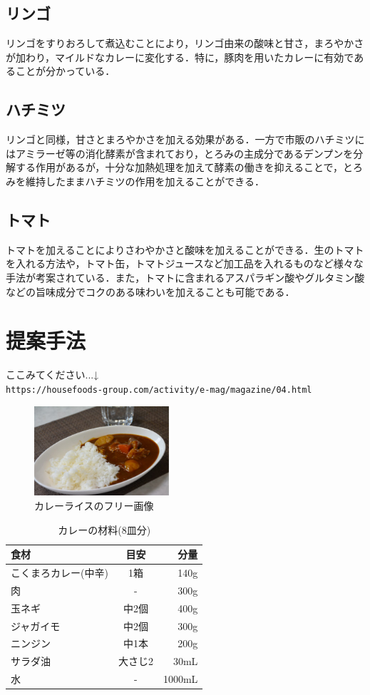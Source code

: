 \documentclass[a4paper, 11pt]{jsarticle}
\begin{document}
\subsection{リンゴ}
リンゴをすりおろして煮込むことにより，リンゴ由来の酸味と甘さ，まろやかさが加わり，マイルドなカレーに変化する．特に，豚肉を用いたカレーに有効であることが分かっている．

\subsection{ハチミツ}
リンゴと同様，甘さとまろやかさを加える効果がある．一方で市販のハチミツにはアミラーゼ等の消化酵素が含まれており，とろみの主成分であるデンプンを分解する作用があるが，十分な加熱処理を加えて酵素の働きを抑えることで，とろみを維持したままハチミツの作用を加えることができる．

\subsection{トマト}
トマトを加えることによりさわやかさと酸味を加えることができる．生のトマトを入れる方法や，トマト缶，トマトジュースなど加工品を入れるものなど様々な手法が考案されている．また，トマトに含まれるアスパラギン酸やグルタミン酸などの旨味成分でコクのある味わいを加えることも可能である．

\section{提案手法}
ここみてください...↓\\
\texttt{https://housefoods-group.com/activity/e-mag/magazine/04.html}

\begin{figure}[htb]
	\begin{center}
		\includegraphics[clip,width = 5.0cm]{curry.eps}
	\end{center}
	\caption{カレーライスのフリー画像}  \label{curryfig}
\end{figure}

\begin{table}[htb]
	\caption{カレーの材料(8皿分)}
	\centering
	\begin{tabular}{lcr}
		\hline
		食材 & 目安 & 分量 \\
		\hline\hline
		こくまろカレー(中辛) & 1箱 & 140g\\
		肉 & - & 300g\\
		玉ネギ & 中2個 & 400g \\
		ジャガイモ & 中2個 & 300g \\
		ニンジン & 中1本 & 200g \\
		サラダ油 & 大さじ2 & 30mL \\
		水 & - & 1000mL \\
		\hline
	\end{tabular}
\end{table}
\end{document}
